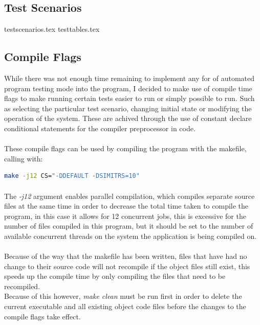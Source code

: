 \subsection{Test Scenarios}
{testscenarios.tex}
{testtables.tex}
\pagebreak
\subsection{Compile Flags}
While there was not enough time remaining to implement any for of automated program testing mode into the program, I decided to make use of compile time flags to make running certain tests easier to run or simply possible to run. Such as selecting the particular test scenario, changing initial state or modifying the operation of the system. These are achived through the use of constant declare conditional statements for the compiler preprocessor in code.

\paragraph{}
These compile flags can be used by compiling the program with the makefile, calling with:
\begin{lstlisting}[language=bash]
  make -j12 CS="-DDEFAULT -DSIMITRS=10"
\end{lstlisting}
\paragraph{}
The \textit{-j12} argument enables parallel compilation, which compiles separate source files at the same time in order to decrease the total time taken to compile the program, in this case it allows for 12 concurrent jobs, this is excessive for the number of files compiled in this program, but it should be set to the number of available concurrent threads on the system the application is being compiled on.

\paragraph{}
Because of the way that the makefile has been written, files that have had no change to their source code will not recompile if the object files still exist, this speeds up the compile time by only compiling the files that need to be recompiled. \\
Because of this however, \textit{make clean} must be run first in order to delete the current executable and all existing object code files before the changes to the compile flags take effect.

